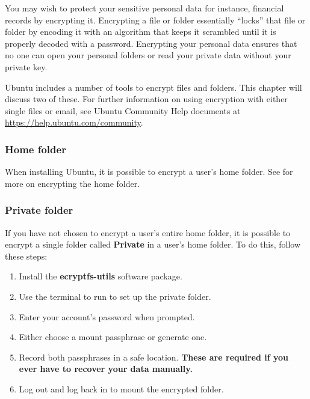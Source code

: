 You may wish to protect your sensitive personal data \dash for instance, financial records \dash by encrypting it.  Encrypting a file or folder essentially ``locks'' that file or folder by encoding it with an algorithm that keeps it scrambled until it is properly decoded with a password.  Encrypting your personal data ensures that no one can open your personal folders or read your private data without your private key.

Ubuntu includes a number of tools to encrypt files and folders. This chapter will discuss two of these. For further information on using encryption with either single files or email, see Ubuntu Community Help documents at \href{https://help.ubuntu.com/community}{https://help.ubuntu.com/community}. 

\subsubsection{Home folder}
\label{sec:security:home-Folder}

When installing Ubuntu, it is possible to encrypt a user's home folder. See  for more on encrypting the home folder.

\subsubsection{Private folder}
\label{sec:security:private-folder}

If you have not chosen to encrypt a user's entire home folder, it is possible to encrypt a single folder \dash called \textbf{Private} \dash in a user's home folder.
To do this, follow these steps:
\begin{enumerate}
	\item Install the \textbf{ecryptfs-utils} software package. %
	\item Use the terminal to run  to set up the private folder.
	\item Enter your account's password when prompted.
	\item Either choose a mount passphrase or generate one.
	\item Record both passphrases in a safe location. \textbf{These are required if you ever have to recover your data manually.}
	\item Log out and log back in to mount the encrypted folder.
\end{enumerate}

